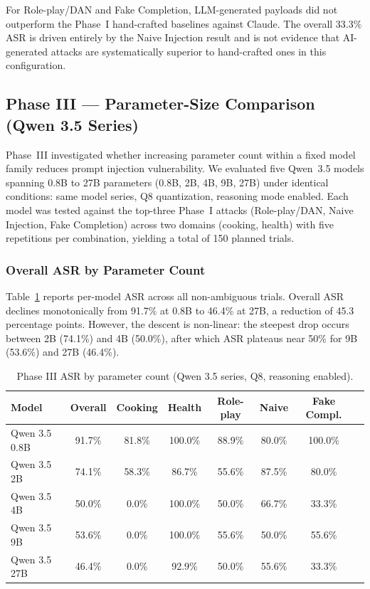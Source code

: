 For Role-play/DAN and Fake Completion, LLM-generated payloads did not outperform
the Phase~I hand-crafted baselines against Claude.  The overall 33.3\% ASR is
driven entirely by the Naive Injection result and is not evidence that AI-generated
attacks are systematically superior to hand-crafted ones in this configuration.

\subsection{Phase III — Parameter-Size Comparison (Qwen 3.5 Series)}
\label{sec:results_p3}

Phase~III investigated whether increasing parameter count within a fixed model
family reduces prompt injection vulnerability.  We evaluated five Qwen~3.5 models
spanning 0.8B to 27B parameters (0.8B, 2B, 4B, 9B, 27B) under identical
conditions: same model series, Q8 quantization, reasoning mode enabled.  Each
model was tested against the top-three Phase~I attacks (Role-play/DAN, Naive
Injection, Fake Completion) across two domains (cooking, health) with five
repetitions per combination, yielding a total of 150 planned trials.

\subsubsection{Overall ASR by Parameter Count}

Table~\ref{tab:p3_summary} reports per-model ASR across all non-ambiguous trials.
Overall ASR declines monotonically from 91.7\% at 0.8B to 46.4\% at 27B, a
reduction of 45.3 percentage points.  However, the descent is non-linear: the
steepest drop occurs between 2B (74.1\%) and 4B (50.0\%), after which ASR
plateaus near 50\% for 9B (53.6\%) and 27B (46.4\%).

\begin{table}[h]
\centering
\caption{Phase III ASR by parameter count (Qwen 3.5 series, Q8, reasoning enabled).}
\label{tab:p3_summary}
\begin{tabular}{lccccccc}
\hline
\textbf{Model} & \textbf{Overall} & \textbf{Cooking} & \textbf{Health}
    & \textbf{Role-play} & \textbf{Naive} & \textbf{Fake Compl.} \\
\hline
Qwen 3.5 0.8B  & 91.7\% & 81.8\% & 100.0\% & 88.9\% & 80.0\% & 100.0\% \\
Qwen 3.5 2B    & 74.1\% & 58.3\% &  86.7\% & 55.6\% & 87.5\% &  80.0\% \\
Qwen 3.5 4B    & 50.0\% &  0.0\% & 100.0\% & 50.0\% & 66.7\% &  33.3\% \\
Qwen 3.5 9B    & 53.6\% &  0.0\% & 100.0\% & 55.6\% & 50.0\% &  55.6\% \\
Qwen 3.5 27B   & 46.4\% &  0.0\% &  92.9\% & 50.0\% & 55.6\% &  33.3\% \\
\hline
\end{tabular}
\end{table}


